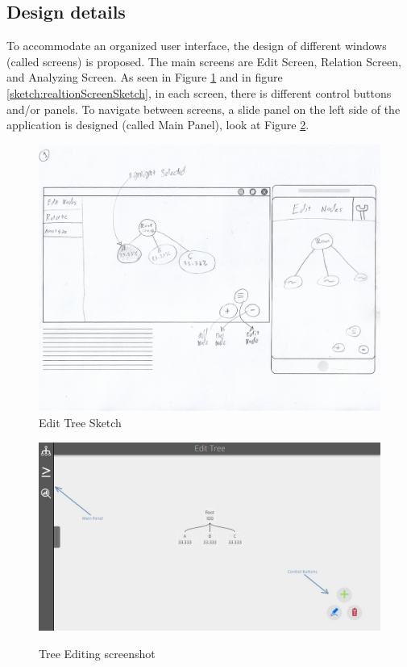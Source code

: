 \documentclass[11pt]{article} %
\begin{document}
\subsection{Design details}
To accommodate an organized user interface, the design of different windows (called screens) is proposed. The main screens are Edit Screen, Relation Screen, and Analyzing Screen. As seen in Figure \ref{sketch:basic screen} and in figure \ref{sketch:realtionScreenSketch}, in each screen, there is different control buttons and/or panels. To navigate between screens, a slide panel on the left side of the application is designed (called Main Panel), look at Figure \ref{screenshot:tree editing}.

\begin{figure}
   	\centering
    	\caption{Edit Tree Sketch}
 	\includegraphics[width=\linewidth]{skitchScreens}
    
    \label{sketch:basic screen}
\end{figure}



\begin{figure}
  \caption{Tree Editing screenshot}
  \centering
  \includegraphics[width=\linewidth]{editTreeScreenshot}
  \label{screenshot:tree editing}
\end{figure}
\end{document}
